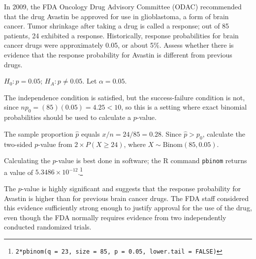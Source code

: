 \begin{example}{In 2009, the FDA Oncology Drug Advisory Committee (ODAC) recommended that the drug Avastin be approved for use in glioblastoma, a form of brain cancer. Tumor shrinkage after taking a drug is called a response; out of 85 patients, 24 exhibited a response. Historically, response probabilities for brain cancer drugs were approximately 0.05, or about 5\%. Assess whether there is evidence that the response probability for Avastin is different from previous drugs. 		
}	

$H_0: p = 0.05$; $H_A: p \neq 0.05$. Let $\alpha = 0.05$. 


The independence condition is satisfied, but the success-failure condition is not, since $np_0 = (85)(0.05) = 4.25 < 10$, so this is a setting where exact binomial probabilities should be used to calculate a $p$-value.

The sample proportion $\hat{p}$ equals $x/n = 24/85 = 0.28$. Since $\hat{p} > p_0$, calculate the two-sided $p$-value from $2 \times P(X \geq 24)$, where $X \sim \text{Binom}(85, 0.05)$.

Calculating the $p$-value is best done in software; the \textsf{R} command \texttt{pbinom} returns a value of $5.3486 \times 10^{-12}$.\footnote{\texttt{2*pbinom(q = 23, size = 85, p = 0.05, lower.tail = FALSE)}}

The $p$-value is highly significant and suggests that the response probability for Avastin is higher than for previous brain cancer drugs. The FDA staff considered this evidence sufficiently strong enough to justify approval for the use of the drug, even though the FDA normally requires evidence from two independently conducted randomized trials. 
	
\end{example}

